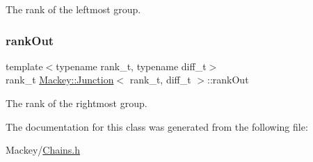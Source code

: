 The rank of the leftmost group. 

\mbox{\label{classMackey_1_1Junction_afe400bc60b84966b933fd57c11400607}} 
\subsubsection{\texorpdfstring{rank\+Out}{rankOut}}
{\footnotesize\ttfamily template$<$typename rank\+\_\+t, typename diff\+\_\+t$>$ \\
rank\+\_\+t \hyperlink{classMackey_1_1Junction}{Mackey\+::\+Junction}$<$ rank\+\_\+t, diff\+\_\+t $>$\+::rank\+Out}



The rank of the rightmost group. 



The documentation for this class was generated from the following file\+:\begin{DoxyCompactItemize}
\item 
Mackey/\hyperlink{Chains_8h}{Chains.\+h}\end{DoxyCompactItemize}

